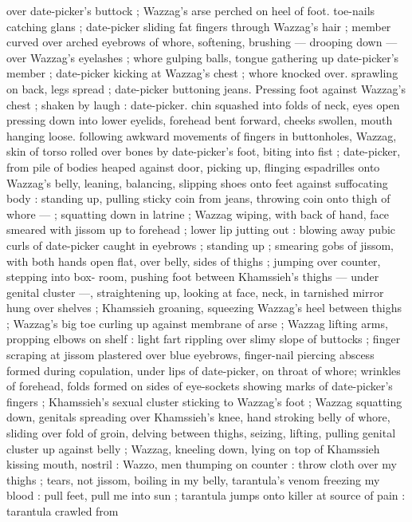 over date-picker's buttock ; Wazzag's arse perched on heel of foot. 
toe-nails catching glans ; date-picker sliding fat fingers through 
Wazzag's hair ; member curved over arched eyebrows of whore, 
softening, brushing --- drooping down --- over Wazzag's eyelashes 
; whore gulping balls, tongue gathering up date-picker's member ; 
date-picker kicking at Wazzag's chest ; whore knocked over. 
sprawling on back, legs spread ; date-picker buttoning jeans. 
Pressing foot against Wazzag's chest ; shaken by laugh : date-picker. 
chin squashed into folds of neck, eyes open pressing down into 
lower eyelids, forehead bent forward, cheeks swollen, mouth hanging 
loose. following awkward movements of fingers in buttonholes, 
Wazzag, skin of torso rolled over bones by date-picker's foot, biting 
into fist ; date-picker, from pile of bodies heaped against door, 
picking up, flinging espadrilles onto Wazzag's belly, leaning, 
balancing, slipping shoes onto feet against suffocating body : 
standing up, pulling sticky coin from jeans, throwing coin onto thigh 
of whore --- ; squatting down in latrine ; Wazzag wiping, with back of 
hand, face smeared with jissom up to forehead ; lower lip jutting out 
: blowing away pubic curls of date-picker caught in eyebrows ; 
standing up ; smearing gobs of jissom, with both hands open flat, 
over belly, sides of thighs ; jumping over counter, stepping into box- 
room, pushing foot between Khamssieh's thighs --- under genital 
cluster ---, straightening up, looking at face, neck, in tarnished 
mirror hung over shelves ; Khamssieh groaning, squeezing Wazzag's 
heel between thighs ; Wazzag's big toe curling up against membrane 
of arse ; Wazzag lifting arms, propping elbows on shelf : light fart 
rippling over slimy slope of buttocks ; finger scraping at jissom 
plastered over blue eyebrows, finger-nail piercing abscess formed 
during copulation, under lips of date-picker, on throat of whore; 
wrinkles of forehead, folds formed on sides of eye-sockets showing 
marks of date-picker's fingers ; Khamssieh's sexual cluster sticking 
to Wazzag's foot ; Wazzag squatting down, genitals spreading over 
Khamssieh's knee, hand stroking belly of whore, sliding over fold of 
groin, delving between thighs, seizing, lifting, pulling genital cluster 
up against belly ; Wazzag, kneeling down, lying on top of Khamssieh 
kissing mouth, nostril : {\gl} {\td} Wazzo, men thumping on counter : throw 
cloth over my thighs ; tears, not jissom, boiling in my belly, 
tarantula's venom freezing my blood : pull feet, pull me into sun ; 
tarantula jumps onto killer at source of pain : tarantula crawled from 
